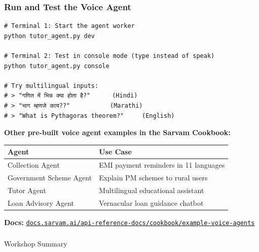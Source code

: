 \begin{frame}[fragile]\frametitle{Run and Test the Voice Agent}
\begin{lstlisting}
# Terminal 1: Start the agent worker
python tutor_agent.py dev

# Terminal 2: Test in console mode (type instead of speak)
python tutor_agent.py console

# Try multilingual inputs:
# > "गणित में भिन्न क्या होता है?"      (Hindi)
# > "भाग म्हणजे काय??"           (Marathi)
# > "What is Pythagoras theorem?"     (English)
\end{lstlisting}

\textbf{Other pre-built voice agent examples in the Sarvam Cookbook:}
\begin{center}
\begin{tabular}{|p{3cm}|p{3cm}|}
\hline
\textbf{Agent} & \textbf{Use Case} \\
\hline
Collection Agent & EMI payment reminders in 11 languages \\
Government Scheme Agent & Explain PM schemes to rural users \\
Tutor Agent & Multilingual educational assistant \\
Loan Advisory Agent & Vernacular loan guidance chatbot \\
\hline
\end{tabular}
\end{center}

\textbf{Docs:} \href{https://docs.sarvam.ai/api-reference-docs/cookbook/example-voice-agents/collection-agent}{\small\texttt{docs.sarvam.ai/api-reference-docs/cookbook/example-voice-agents}}
\end{frame}


\begin{frame}[fragile]\frametitle{}
\begin{center}
{\Large Workshop Summary}
\end{center}
\end{frame}

